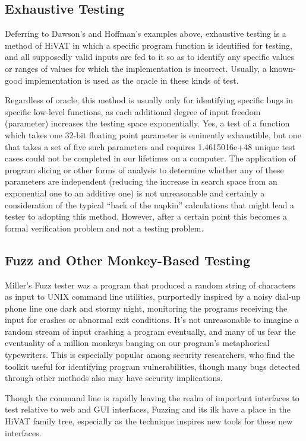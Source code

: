 \subsection{Exhaustive Testing}
Deferring to Dawson's and Hoffman's examples above, exhaustive testing is a method of HiVAT in which a specific program function is identified for testing, and all supposedly valid inputs are fed to it so as to identify any specific values or ranges of values for which the implementation is incorrect. Usually, a known-good implementation is used as the oracle in these kinds of test.

Regardless of oracle, this method is usually only for identifying specific bugs in specific low-level functions, as each additional degree of input freedom (parameter) increases the testing space exponentially. Yes, a test of a function which takes one 32-bit floating point parameter is eminently exhaustible, but one that takes a set of five such parameters and requires 1.4615016e+48 unique test cases could not be completed in our lifetimes on a computer. The application of program slicing \citep{gallagher1991using} or other forms of analysis to determine whether any of these parameters are independent (reducing the increase in search space from an exponential one to an additive one) is not unreasonable and certainly a consideration of the typical ``back of the napkin'' calculations that might lead a tester to adopting this method. However, after a certain point this becomes a formal verification problem and not a testing problem.

\subsection{Fuzz and Other Monkey-Based Testing}
 Miller's Fuzz tester was a program that produced a random string of characters as input to UNIX command line utilities, purportedly inspired by a noisy dial-up phone line one dark and stormy night, monitoring the programs receiving the input for crashes or abnormal exit conditions. It's not unreasonable to imagine a random stream of input crashing a program eventually, and many of us fear the eventuality of a million monkeys banging on our program's metaphorical typewriters. This is especially popular among security researchers, who find the toolkit useful for identifying program vulnerabilities, though many bugs detected through other methods also may have security implications.

 Though the command line is rapidly leaving the realm of important interfaces to test relative to web and GUI interfaces, Fuzzing and its ilk have a place in the HiVAT family tree, especially as the technique inspires new tools for these new interfaces.

